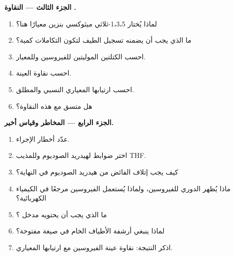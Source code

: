 \begin{problem}
\medskip\noindent\textbf{الجزء الثالث --- النقاوة .}
\begin{enumerate}[resume]
  \item لماذا يُختار 1،3،5-ثلاثي ميثوكسي بنزين معيارًا هنا؟
  \item ما الذي يجب أن يضمنه تسجيل الطيف لتكون التكاملات كمية؟
  \item احسب الكتلتين الموليتين للفيروسين وللمعيار.
  \item احسب نقاوة العينة.
  \item احسب ارتيابها المعياري النسبي والمطلق.
  \item هل  متسق مع هذه النقاوة؟
\end{enumerate}

\medskip\noindent\textbf{الجزء الرابع --- المخاطر وقياس أخير.}
\begin{enumerate}[resume]
  \item عدّد أخطار الإجراء.
  \item اختر ضوابط لهيدريد الصوديوم وللمذيب THF.
  \item كيف يجب إتلاف الفائض من هيدريد الصوديوم في النهاية؟
  \item ماذا يُظهر  الدوري للفيروسين، ولماذا يُستعمل الفيروسين
        مرجعًا في الكيمياء الكهربائية؟
  \item ما الذي يجب أن يحتويه مدخل  ؟
  \item لماذا ينبغي أرشفة الأطياف الخام في صيغة مفتوحة؟
  \item اذكر النتيجة: نقاوة عينة الفيروسين  مع ارتيابها
        المعياري.
\end{enumerate}
\end{problem}
